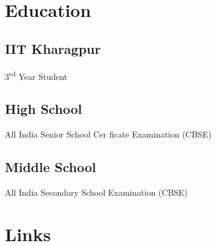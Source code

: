 \documentclass[a4paper]{deedy-resume} %
\begin{document}
\begin{minipage}[t]{0.33\textwidth} %


\section{Education} 

\subsection{IIT Kharagpur}

3\textsuperscript{rd} Year Student \\

\sectionspace %


\subsection{High School}

All India Senior School Cer ficate Examination (CBSE) \\

\sectionspace %


\subsection{Middle School}

All India Secondary School Examination (CBSE) \\

\sectionspace %


\section{Links} 


\end{minipage}
\end{document}

